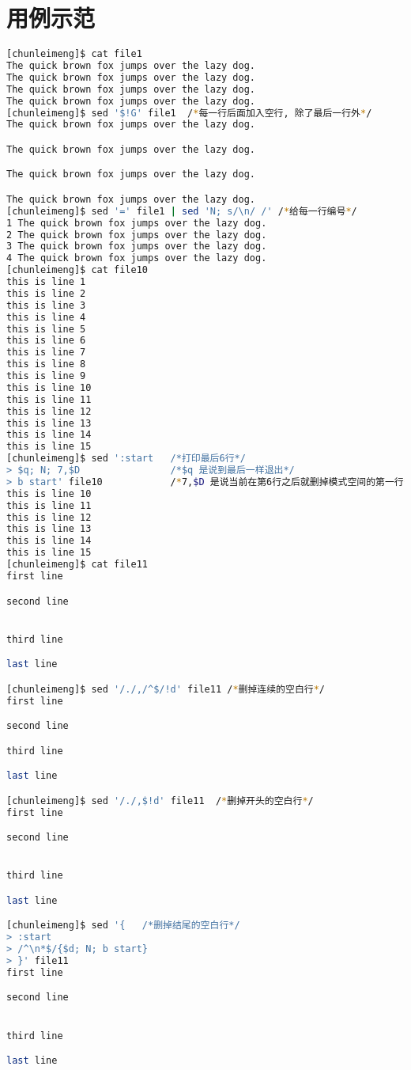 \documentclass{article}
\begin{document}
\section{用例示范}
\begin{lstlisting}[language=bash, caption={Example}]
[chunleimeng]$ cat file1
The quick brown fox jumps over the lazy dog.
The quick brown fox jumps over the lazy dog.
The quick brown fox jumps over the lazy dog.
The quick brown fox jumps over the lazy dog.
[chunleimeng]$ sed '$!G' file1  /*每一行后面加入空行, 除了最后一行外*/
The quick brown fox jumps over the lazy dog.

The quick brown fox jumps over the lazy dog.

The quick brown fox jumps over the lazy dog.

The quick brown fox jumps over the lazy dog.
[chunleimeng]$ sed '=' file1 | sed 'N; s/\n/ /' /*给每一行编号*/
1 The quick brown fox jumps over the lazy dog.
2 The quick brown fox jumps over the lazy dog.
3 The quick brown fox jumps over the lazy dog.
4 The quick brown fox jumps over the lazy dog. 
[chunleimeng]$ cat file10
this is line 1
this is line 2
this is line 3
this is line 4
this is line 5
this is line 6
this is line 7
this is line 8
this is line 9
this is line 10
this is line 11
this is line 12
this is line 13
this is line 14
this is line 15
[chunleimeng]$ sed ':start   /*打印最后6行*/
> $q; N; 7,$D                /*$q 是说到最后一样退出*/
> b start' file10            /*7,$D 是说当前在第6行之后就删掉模式空间的第一行*/
this is line 10
this is line 11
this is line 12
this is line 13
this is line 14
this is line 15
[chunleimeng]$ cat file11
first line

second line


third line

last line

[chunleimeng]$ sed '/./,/^$/!d' file11 /*删掉连续的空白行*/
first line

second line

third line

last line

[chunleimeng]$ sed '/./,$!d' file11  /*删掉开头的空白行*/
first line

second line


third line

last line

[chunleimeng]$ sed '{   /*删掉结尾的空白行*/
> :start
> /^\n*$/{$d; N; b start}
> }' file11
first line

second line


third line

last line
\end{lstlisting}
\end{document}
